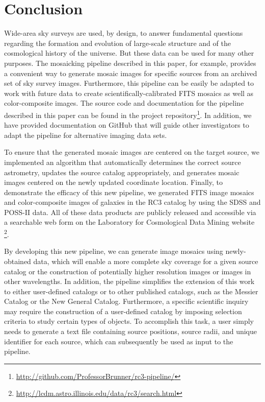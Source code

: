 \documentclass[authoryear, 12pt, 5p, times]{elsarticle}
\begin{document}
 \section{Conclusion\label{conc-sec}}
 
Wide-area sky surveys are used, by design, to answer fundamental questions regarding the formation and evolution of large-scale structure and of the cosmological history of the universe. But these data can be used for many other purposes. The mosaicking pipeline described in this paper, for example, provides a convenient way to generate mosaic images for specific sources from an archived set of sky survey images.  Furthermore, this pipeline can be easily be adapted to work with future data to create scientifically-calibrated FITS mosaics as well as color-composite images. The source code and documentation for the pipeline described in this paper can be found in the project repository\footnote{\url{http://github.com/ProfessorBrunner/rc3-pipeline/}}. In addition, we have provided documentation on GitHub that will guide other investigators to adapt the pipeline for alternative imaging data sets.

To ensure that the generated mosaic images are centered on the target source, we implemented an algorithm that automatically determines the correct source astrometry, updates the source catalog appropriately, and generates mosaic images centered on the newly updated coordinate location. Finally, to demonstrate the efficacy of this new pipeline, we generated FITS image mosaics and color-composite images of galaxies in the RC3 catalog by using the SDSS and POSS-II data. All of these data products are publicly released and accessible via a searchable web form on the Laboratory for Cosmological Data Mining website \footnote{\url{http://lcdm.astro.illinois.edu/data/rc3/search.html}}.

By developing this new pipeline, we can generate image mosaics using newly-obtained data, which will enable a more complete sky coverage for a given source catalog or the construction of potentially higher resolution images or images in other wavelengths. In addition, the pipeline simplifies the extension of this work to either user-defined catalogs or to other published catalogs, such as the Messier Catalog or the New General Catalog. Furthermore, a specific scientific inquiry may require the construction of a user-defined catalog  by imposing selection criteria to study certain types of objects. To accomplish this task, a user simply needs to generate a text file containing source positions, source radii, and unique identifier for each source, which can subsequently be used as input to the pipeline. 
\end{document}
